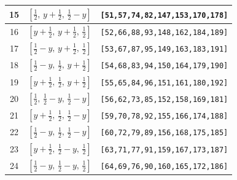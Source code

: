 \documentclass[fleqn,8pt]{jsarticle}
\begin{document}
\begin{longtable}{ccc}
15 & $\left[ \frac{1}{2},\, y + \frac{1}{2},\, \frac{1}{2} - y \right]$ & {\tt [51,57,74,82,147,153,170,178]} \\ \hline
16 & $\left[ y + \frac{1}{2},\, y + \frac{1}{2},\, \frac{1}{2} \right]$ & {\tt [52,66,88,93,148,162,184,189]} \\ \hline
17 & $\left[ \frac{1}{2} - y,\, y + \frac{1}{2},\, \frac{1}{2} \right]$ & {\tt [53,67,87,95,149,163,183,191]} \\ \hline
18 & $\left[ \frac{1}{2} - y,\, \frac{1}{2},\, y + \frac{1}{2} \right]$ & {\tt [54,68,83,94,150,164,179,190]} \\ \hline
19 & $\left[ y + \frac{1}{2},\, \frac{1}{2},\, y + \frac{1}{2} \right]$ & {\tt [55,65,84,96,151,161,180,192]} \\ \hline
20 & $\left[ \frac{1}{2},\, \frac{1}{2} - y,\, \frac{1}{2} - y \right]$ & {\tt [56,62,73,85,152,158,169,181]} \\ \hline
21 & $\left[ y + \frac{1}{2},\, \frac{1}{2},\, \frac{1}{2} - y \right]$ & {\tt [59,70,78,92,155,166,174,188]} \\ \hline
22 & $\left[ \frac{1}{2} - y,\, \frac{1}{2},\, \frac{1}{2} - y \right]$ & {\tt [60,72,79,89,156,168,175,185]} \\ \hline
23 & $\left[ y + \frac{1}{2},\, \frac{1}{2} - y,\, \frac{1}{2} \right]$ & {\tt [63,71,77,91,159,167,173,187]} \\ \hline
24 & $\left[ \frac{1}{2} - y,\, \frac{1}{2} - y,\, \frac{1}{2} \right]$ & {\tt [64,69,76,90,160,165,172,186]} \\
\end{longtable}
\renewcommand{\arraystretch}{1.2}
\end{document}
